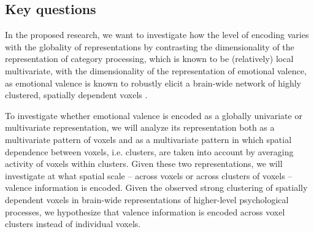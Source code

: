 \documentclass[jou,12pt,a4paper]{apa6}\usepackage[]{graphicx}\usepackage[]{color}
\begin{document}


\subsection{Key questions}

In the proposed research, we want to investigate how the level of encoding varies with the globality of representations by contrasting the dimensionality of the representation of category processing, which is known to be (relatively) local multivariate, with the dimensionality of the representation of emotional valence, as emotional valence is known to robustly elicit a brain-wide network of highly clustered, spatially dependent voxels \cite{lindquist2015,chavez2015}.     

To investigate whether emotional valence is encoded as a globally univariate or multivariate representation, we will analyze its representation both as a multivariate pattern of voxels and as a multivariate pattern in which spatial dependence between voxels, i.e. clusters, are taken into account by averaging activity of voxels within clusters. Given these two representations, we will investigate at what spatial scale -- across voxels or across clusters of voxels -- valence information is encoded.  Given the observed strong clustering of spatially dependent voxels in brain-wide representations of higher-level psychological processes, we hypothesize that valence information is encoded across voxel clusters instead of individual voxels. %
\end{document}
